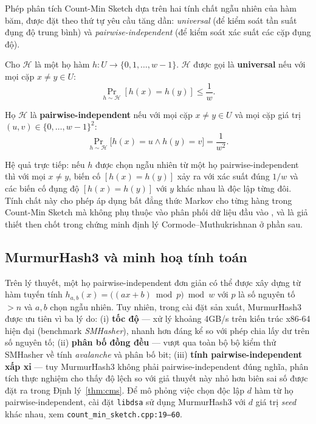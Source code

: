 Phép phân tích Count-Min Sketch dựa trên hai tính chất ngẫu nhiên của hàm băm, được đặt theo thứ tự yêu cầu tăng dần: \textit{universal} (để kiểm soát tần suất đụng độ trung bình) và \textit{pairwise-independent} (để kiểm soát xác suất các cặp đụng độ).

\begin{definition}
\label{def:universal}
Cho $\mathcal{H}$ là một họ hàm $h: U \to \{0, 1, \ldots, w-1\}$. $\mathcal{H}$ được gọi là \textbf{universal} nếu với mọi cặp $x \ne y \in U$:
\begin{equation}
\Pr_{h \sim \mathcal{H}}[h(x) = h(y)] \le \frac{1}{w}.
\label{eq:universal-hash}
\end{equation}
\end{definition}

\begin{definition}
\label{def:pairwise}
Họ $\mathcal{H}$ là \textbf{pairwise-independent} nếu với mọi cặp $x \ne y \in U$ và mọi cặp giá trị $(u, v) \in \{0, \ldots, w-1\}^2$:
\begin{equation}
\Pr_{h \sim \mathcal{H}}\bigl[h(x) = u \wedge h(y) = v\bigr] = \frac{1}{w^2}.
\label{eq:pairwise-independence}
\end{equation}
\end{definition}

Hệ quả trực tiếp: nếu $h$ được chọn ngẫu nhiên từ một họ pairwise-independent thì với mọi $x \ne y$, biến cố $[h(x) = h(y)]$ xảy ra với xác suất đúng $1/w$ và các biến cố đụng độ $[h(x) = h(y)]$ với $y$ khác nhau là độc lập từng đôi. Tính chất này cho phép áp dụng bất đẳng thức Markov cho từng hàng trong Count-Min Sketch mà không phụ thuộc vào phân phối dữ liệu đầu vào \cite{mitzenmacher2005probability}, và là giả thiết then chốt trong chứng minh định lý Cormode--Muthukrishnan ở phần sau.

\subsection{MurmurHash3 và minh hoạ tính toán}

Trên lý thuyết, một họ pairwise-independent đơn giản có thể được xây dựng từ hàm tuyến tính $h_{a,b}(x) = \bigl((a x + b) \bmod p\bigr) \bmod w$ với $p$ là số nguyên tố $> n$ và $a, b$ chọn ngẫu nhiên. Tuy nhiên, trong cài đặt sản xuất, MurmurHash3 \cite{appleby2011murmur} được ưu tiên vì ba lý do: (i) \textbf{tốc độ} --- xử lý khoảng 4GB/s trên kiến trúc x86-64 hiện đại (benchmark \textit{SMHasher}), nhanh hơn đáng kể so với phép chia lấy dư trên số nguyên tố; (ii) \textbf{phân bố đồng đều} --- vượt qua toàn bộ bộ kiểm thử SMHasher về tính \textit{avalanche} và phân bố bit; (iii) \textbf{tính pairwise-independent xấp xỉ} --- tuy MurmurHash3 không phải pairwise-independent đúng nghĩa, phân tích thực nghiệm cho thấy độ lệch so với giả thuyết này nhỏ hơn biên sai số được đặt ra trong Định lý~\ref{thm:cms}. Để mô phỏng việc chọn độc lập $d$ hàm từ họ pairwise-independent, cài đặt \texttt{libdsa} sử dụng MurmurHash3 với $d$ giá trị \textit{seed} khác nhau, xem \texttt{count\_min\_sketch.cpp:19--60}.


